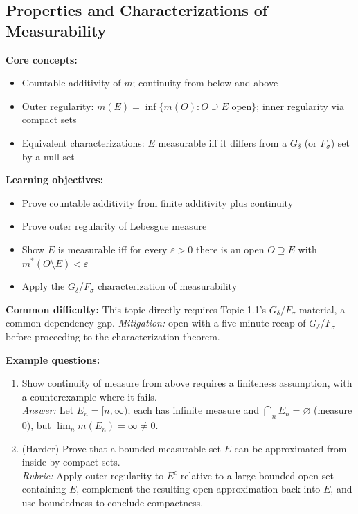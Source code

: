 \documentclass[11pt]{article}
\begin{document}
\subsection{Properties and Characterizations of Measurability}

\textbf{Core concepts:}
\begin{itemize}[nosep]
\item Countable additivity of $m$; continuity from below and above
\item Outer regularity: $m(E)=\inf\{m(O):O\supseteq E \text{ open}\}$; inner regularity via compact sets
\item Equivalent characterizations: $E$ measurable iff it differs from a $G_\delta$ (or $F_\sigma$) set by a null set
\end{itemize}

\textbf{Learning objectives:}
\begin{itemize}[nosep]
\item Prove countable additivity from finite additivity plus continuity
\item Prove outer regularity of Lebesgue measure
\item Show $E$ is measurable iff for every $\varepsilon>0$ there is an open $O\supseteq E$ with $m^*(O\setminus E)<\varepsilon$
\item Apply the $G_\delta$/$F_\sigma$ characterization of measurability
\end{itemize}

\textbf{Common difficulty:} This topic directly requires Topic 1.1's $G_\delta$/$F_\sigma$ material, a common dependency gap. \textit{Mitigation:} open with a five-minute recap of $G_\delta$/$F_\sigma$ before proceeding to the characterization theorem.

\textbf{Example questions:}
\begin{enumerate}[nosep]
\item Show continuity of measure from above requires a finiteness assumption, with a counterexample where it fails. \\
\textit{Answer:} Let $E_n=[n,\infty)$; each has infinite measure and $\bigcap_n E_n=\varnothing$ (measure $0$), but $\lim_n m(E_n)=\infty\ne0$.
\item (Harder) Prove that a bounded measurable set $E$ can be approximated from inside by compact sets. \\
\textit{Rubric:} Apply outer regularity to $E^c$ relative to a large bounded open set containing $E$, complement the resulting open approximation back into $E$, and use boundedness to conclude compactness.
\end{enumerate}
\end{document}
